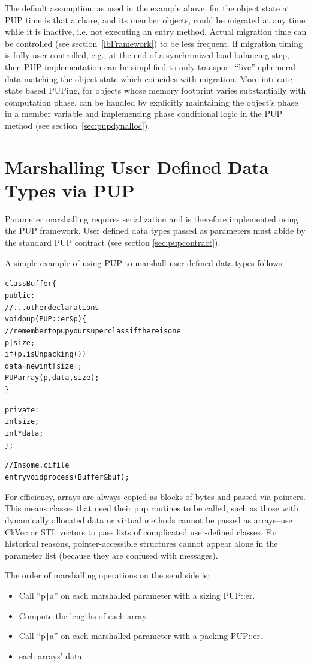 The default assumption, as used in the example above, for the object
state at PUP time is that a chare, and its member objects, could be
migrated at any time while it is inactive, i.e. not executing an entry
method.  Actual migration time can be controlled (see
section~\ref{lbFramework}) to be less frequent.  If migration timing
is fully user controlled, e.g., at the end of a synchronized load
balancing step, then PUP implementation can be simplified to only
transport ``live'' ephemeral data matching the object state which
coincides with migration.  More intricate state based PUPing, for
objects whose memory footprint varies substantially with computation
phase, can be handled by explicitly maintaining the object's phase in
a member variable and implementing phase conditional logic in the PUP
method (see section~\ref{sec:pupdynalloc}).

\section{Marshalling User Defined Data Types via PUP}

Parameter marshalling requires serialization and is therefore
implemented using the PUP framework.  User defined data types passed
as parameters must abide by the standard PUP contract (see section
\ref{sec:pupcontract}).

A simple example of using PUP to marshall user defined data types follows:

\begin{alltt}
class Buffer \{
public:
//...other declarations
  void pup(PUP::er &p) \{
    // remember to pup your superclass if there is one
    p|size;
    if (p.isUnpacking())
      data = new int[size];
    PUParray(p, data, size);
  \}

private:
  int size;
  int *data;
\};


// In some .ci file
entry void process(Buffer &buf);
\end{alltt}

For efficiency, arrays are always copied as blocks of bytes and passed
via pointers.  This means classes that need their pup routines to be
called, such as those with dynamically allocated data or virtual
methods cannot be passed as arrays--use CkVec or STL vectors to pass
lists of complicated user-defined classes.  For historical reasons,
pointer-accessible structures cannot appear alone in the parameter
list (because they are confused with messages).

The order of marshalling operations on the send side is:
\begin{itemize}
\item Call ``p\verb.|.a'' on each marshalled parameter with a sizing PUP::er.
\item Compute the lengths of each array.
\item Call ``p\verb.|.a'' on each marshalled parameter with a packing PUP::er.
\item {} each arrays' data.
\end{itemize}

